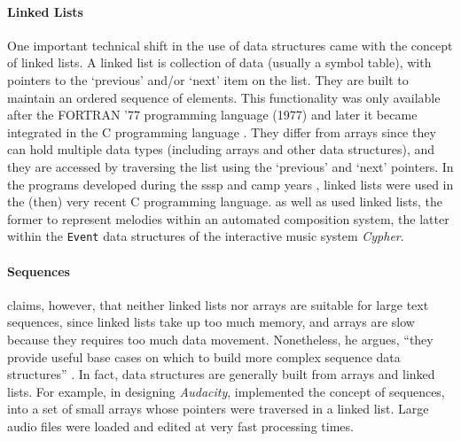 \paragraph{Linked Lists}
\label{computer:linked}
One important technical shift in the use of data structures came with the concept of linked lists. A linked list is collection of data (usually a symbol table), with pointers to the `previous' and/or `next' item on the list. They are built to maintain an ordered sequence of elements. This functionality was only available after the FORTRAN '77 programming language (1977) and later it became integrated in the C programming language \parencite{kernighan_c_1978}. They differ from arrays since they can hold multiple data types (including arrays and other data structures), and they are accessed by traversing the list using the `previous' and `next' pointers. In the programs developed during the \gls{sssp} and \gls{camp} years , linked lists were used in the (then) very recent C programming language. \textcite{icmc/bbp2372.1985.040} as well as \textcite{Row92:Int} used linked lists, the former to represent melodies within an automated composition system, the latter within the \texttt{Event} data structures of the interactive music system \textit{Cypher}.

\paragraph{Sequences}
\label{computer:audacity}
\textcite{crowley98} claims, however, that neither linked lists nor arrays are suitable for large text sequences, since linked lists take up too much memory, and arrays are slow because they requires too much data movement. Nonetheless, he argues, ``they provide useful base cases on which to build more complex sequence data structures'' \parencite{crowley98}. In fact, data structures are generally built from arrays and linked lists. For example, in designing \textit{Audacity}, \textcite{icmc/bbp2372.2001.051} implemented the concept of sequences, into a set of small arrays whose pointers were traversed in a linked list. Large audio files were loaded and edited at very fast processing times.
